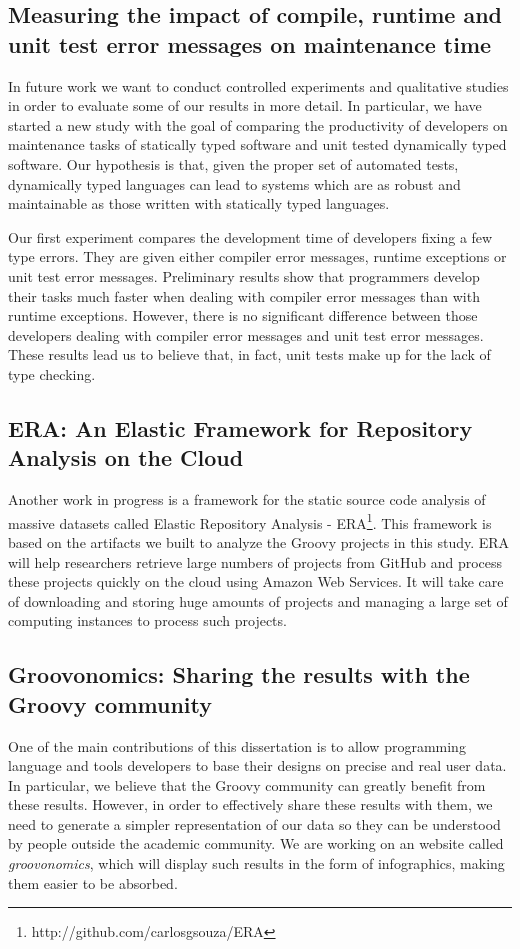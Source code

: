\documentclass[msc]{ppgccufmg}
\begin{document}
\subsection*{Measuring the impact of compile, runtime and unit test error messages on maintenance time}
In future work we want to conduct controlled experiments and qualitative studies in order to evaluate some of our results in more detail.
In particular, we have started a new study with the goal of comparing the productivity of developers on maintenance tasks of statically typed software and unit tested dynamically typed software.
Our hypothesis is that, given the proper set of automated tests, dynamically typed languages can lead to systems which are as robust and maintainable as those written with statically typed languages.

Our first experiment compares the development time of developers fixing a few type errors.
They are given either compiler error messages, runtime exceptions or unit test error messages.
Preliminary results show that programmers develop their tasks much faster when dealing with compiler error messages than with runtime exceptions.
However, there is no significant difference between those developers dealing with compiler error messages and unit test error messages.
These results lead us to believe that, in fact, unit tests make up for the lack of type checking.

\subsection*{ERA: An Elastic Framework for Repository Analysis on the Cloud}
Another work in progress is a framework for the static source code analysis of massive datasets called Elastic Repository Analysis - ERA\footnote{http://github.com/carlosgsouza/ERA}.
This framework is based on the artifacts we built to analyze the Groovy projects in this study.
ERA will help researchers retrieve large numbers of projects from GitHub and process these projects quickly on the cloud using Amazon Web Services.
It will take care of downloading and storing huge amounts of projects and managing a large set of computing instances to process such projects.


\subsection*{Groovonomics: Sharing the results with the Groovy community}
One of the main contributions of this dissertation is to allow programming language and tools developers to base their designs on precise and real user data.
In particular, we believe that the Groovy community can greatly benefit from these results.
However, in order to effectively share these results with them, we need to generate a simpler representation of our data so they can be understood by people outside the academic community.
We are working on an website called \emph{groovonomics}, which will display such results in the form of infographics, making them easier to be absorbed.
\end{document}
